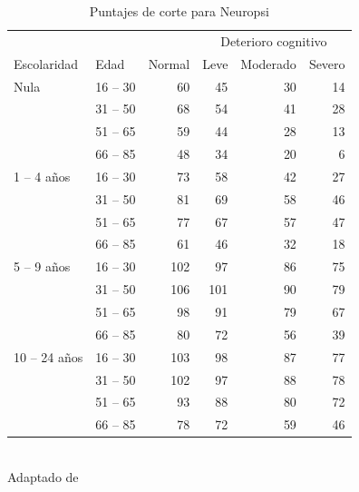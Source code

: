 \begin{table}
\centering
\caption{Puntajes de corte para Neuropsi}
\begin{tabular}{llrrrr}
\toprule
&&& \multicolumn{3}{c}{Deterioro cognitivo} \\
\cmidrule{4-6} 
Escolaridad & Edad & Normal & Leve & Moderado & Severo\\
\midrule
Nula
& 16 -- 30 & 60 & 45 & 30 & 14 \\
& 31 -- 50 & 68 & 54 & 41 & 28 \\
& 51 -- 65 & 59 & 44 & 28 & 13 \\
& 66 -- 85 & 48 & 34 & 20 & 6 \\
\midrule
1 -- 4 años
& 16 -- 30 & 73 & 58 & 42 & 27 \\
& 31 -- 50 & 81 & 69 & 58 & 46 \\
& 51 -- 65 & 77 & 67 & 57 & 47 \\
& 66 -- 85 & 61 & 46 & 32 & 18 \\
\midrule
5 -- 9 años
& 16 -- 30 &102 & 97 & 86 & 75 \\
& 31 -- 50 &106 &101 & 90 & 79 \\
& 51 -- 65 & 98 & 91 & 79 & 67 \\
& 66 -- 85 & 80 & 72 & 56 & 39 \\
\midrule
10 -- 24 años
& 16 -- 30 &103 & 98 & 87 & 77 \\
& 31 -- 50 &102 & 97 & 88 & 78 \\
& 51 -- 65 & 93 & 88 & 80 & 72 \\
& 66 -- 85 & 78 & 72 & 59 & 46 \\
\bottomrule
\end{tabular}\\
Adaptado de \cite{Ardila12}
\label{puntajes}
\end{table}



